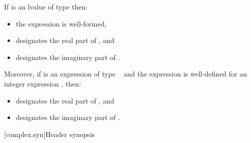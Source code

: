 \pnum
If  is an lvalue of type \cv{}  then:
\begin{itemize}
\item the expression  is well-formed,
\item {} designates the real part of , and
\item {} designates the imaginary part of .
\end{itemize}

Moreover, if  is an expression of type \cv{}~ and the expression  is well-defined for an integer expression , then:
\begin{itemize}
\item {} designates the real part of , and
\item {} designates the imaginary part of .
\end{itemize}

[complex.syn]{Header  synopsis}

